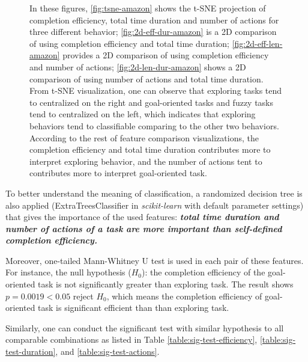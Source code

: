 \begin{figure}
    \caption{In these figures, \ref{fig:tsne-amazon} shows the t-SNE projection
    of completion efficiency, total time duration and number of actions for three different behavior;
    \ref{fig:2d-eff-dur-amazon} is a 2D comparison of using completion efficiency and total time duration;
    \ref{fig:2d-eff-len-amazon} provides a 2D comparison of using completion efficiency and number of actions;
    \ref{fig:2d-len-dur-amazon} shows a 2D comparison of using number of actions and total time duration.
    From t-SNE visualization, one can observe that exploring tasks tend to centralized on the right and goal-oriented
    tasks and fuzzy tasks tend to centralized on the left, which indicates that exploring behaviors tend to classifiable
    comparing to the other two behaviors. According to the rest of feature comparison visualizations, the completion efficiency and total time duration
    contributes more to interpret exploring behavior, and the number of actions tent to
    contributes more to interpret goal-oriented task.}
    \label{fig:general-amazon}
\end{figure}

To better understand the meaning of classification, a randomized decision tree is also applied
(ExtraTreesClassifier in \emph{scikit-learn} \cite{scikit-learn}
with default parameter settings)
that gives the importance of the used features: \textbf{\emph{total time duration and number of actions
of a task are more important than self-defined completion efficiency.}}

Moreover, one-tailed Mann-Whitney U test is used in each pair of these features.
For instance, the null hypothesis ($H_0$): the completion efficiency of the goal-oriented task 
is not significantly greater than exploring task. The result shows $p = 0.0019 < 0.05$ reject $H_0$, 
which means the completion efficiency of goal-oriented task 
is significant efficient than than exploring task.

Similarly, one can conduct the significant test with similar hypothesis 
to all comparable combinations 
as listed in Table \ref{table:sig-test-efficiency}, \ref{table:sig-test-duration}, and \ref{table:sig-test-actions}.

